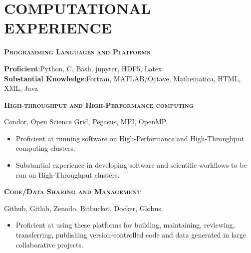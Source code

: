 \section{COMPUTATIONAL EXPERIENCE}
\textsc{\textbf{Programming Languages and Platforms}}
\begin{addmargin}[2em]{2em}
{\textbf{Proficient}:\hspace{2ex}}{Python, C, Bash, jupyter, HDF5, Latex} \\
{\textbf{Substantial Knowledge}:\hspace{2ex}}{Fortran, MATLAB/Octave, Mathematica, HTML, XML, Java}  \\
\end{addmargin}
\vspace*{-2mm}
\textsc{\textbf{High-throughput and High-Performance computing}}
\begin{addmargin}[2em]{2em}
{Condor, Open Science Grid, Pegasus, MPI, OpenMP.
\begin{itemize}
\renewcommand{\labelitemi}{-}
\vspace{-2mm}
\item Proficient at running software on High-Performance and High-Throughput computing clusters.
\vspace{-7mm}
\item Substantial experience in developing software and scientific workflows to be run on High-Throughput clusters.
\end{itemize}
}
\end{addmargin}

\textsc{\textbf{Code/Data Sharing and Management}}
\begin{addmargin}[2em]{2em}
{Github, Gitlab, Zenodo, Bitbucket, Docker, Globus.
\begin{itemize}
\renewcommand{\labelitemi}{-}
\vspace{-2mm}
\item Proficient at using these platforms for building, maintaining, reviewing, transferring, publishing version-controlled code and data generated in large collaborative projects.
\end{itemize}
}
\end{addmargin}

